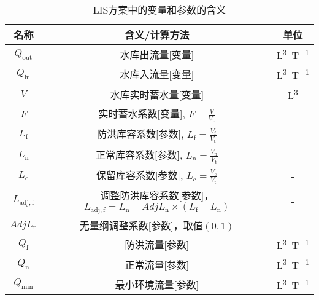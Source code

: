 \begin{table}[htbp]
  \centering
  \caption{LIS方案中的变量和参数的含义}
  \label{tab:LIS方案变量参数表}
  \begin{tabular}{ccc}
    \toprule
    名称                 & 含义/计算方法                                                               & 单位              \\ \midrule
    $Q_{\mathrm{out}}$   & 水库出流量[变量]                                                            & \unit{L^3.T^{-1}} \\
    $Q_{\mathrm{in}}$    & 水库入流量[变量]                                                            & \unit{L^3.T^{-1}} \\
    $V$                  & 水库实时蓄水量[变量]                                                        & \unit{L^3}        \\
    $F$                  & 实时蓄水系数[变量], $F=\frac{V}{V_{\mathrm{t}}}$                            & -                 \\
    $L_{\mathrm{f}}$     & 防洪库容系数[参数], $L_{\mathrm{f}}=\frac{V_{\mathrm{f}}}{V_{\mathrm{t}}}$  & -                 \\
    $L_{\mathrm{n}}$     & 正常库容系数[参数], $L_{\mathrm{n}}=\frac{V_{\mathrm{n}}}{V_{\mathrm{t}}}$  & -                 \\
    $L_{\mathrm{c}}$     & 保留库容系数[参数], $L_{\mathrm{c}}=\frac{V_{\mathrm{c}}}{V_{\mathrm{t}}}$  & -                 \\
    $L_{\mathrm{adj,f}}$ & \makecell{调整防洪库容系数[参数]，                                          \\
    $L_{\mathrm{adj,f}} = L_{\mathrm{n}}+AdjL_{\mathrm{n}} \times \left(L_{\mathrm{f}}-L_{\mathrm{n}}\right)$}
                         & -                                                                           \\
    $AdjL_{\mathrm{n}}$  & 无量纲调整系数[参数]，取值$\left(0,1\right)$                                & -                 \\
    $Q_{\mathrm{f}}$     & 防洪流量[参数]                                                              & \unit{L^3.T^{-1}} \\
    $Q_{\mathrm{n}}$     & 正常流量[参数]                                                              & \unit{L^3.T^{-1}} \\
    $Q_{\mathrm{min}}$   & 最小环境流量[参数]                                                          & \unit{L^3.T^{-1}} \\

\end{tabular}
\end{table}

